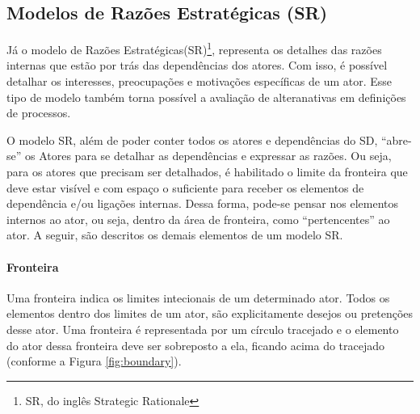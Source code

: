         \subsection{Modelos de Razões Estratégicas (SR)}
                Já o modelo de Razões Estratégicas(SR)\footnote{SR, do inglês Strategic Rationale},
                representa os detalhes das razões internas que estão por trás das dependências dos atores.
                Com isso, é possível detalhar os interesses, preocupações e motivações específicas de um ator.
                Esse tipo de modelo também torna possível a avaliação de alteranativas em definições de processos.

                O modelo SR, além de poder conter todos os atores e dependências do SD, ``abre-se'' os Atores para se detalhar as dependências e expressar as razões.
                Ou seja, para os atores que precisam ser detalhados, é habilitado o limite da fronteira que deve estar visível e com espaço o suficiente para receber os elementos de dependência e/ou ligações internas. 
                Dessa forma, pode-se pensar nos elementos internos ao ator, ou seja, dentro da área de fronteira, como ``pertencentes'' ao ator.
                A seguir, são descritos os demais elementos de um modelo SR.

            \paragraph{Fronteira}
                Uma fronteira indica os limites intecionais de um determinado ator. Todos os elementos dentro dos limites de um ator, são explicitamente desejos ou pretenções desse ator. Uma fronteira é representada por um círculo tracejado e o elemento do ator dessa fronteira deve ser sobreposto a ela, ficando acima do tracejado (conforme a Figura \ref{fig:boundary}).

